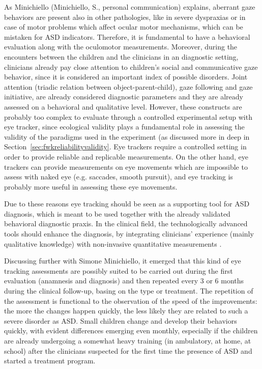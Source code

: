 As Minichiello (Minichiello, S., personal communication) explains, aberrant gaze behaviors are present also in other pathologies, like in severe dyspraxias or in case of motor problems which affect ocular motor mechanisms, which can be mistaken for ASD indicators. Therefore, it is fundamental to have a behavioral evaluation along with the oculomotor measurements.
Moreover, during the encounters between the children and the clinicians in an diagnostic setting, clinicians already pay close attention to children’s social and communicative gaze behavior, since it is considered an important index of possible disorders. Joint attention (triadic relation between object-parent-child), gaze following and gaze initiative, are already considered diagnostic parameters and they are already assessed on a behavioral and qualitative level. However, these constructs are probably too complex to evaluate through a controlled experimental setup with eye tracker, since ecological validity plays a fundamental role in assessing the validity of the paradigms used in the experiment (as discussed more in deep in Section~\ref{sec:fwkreliabilityvalidity}. Eye trackers require a controlled setting in order to provide reliable and replicable measurements. On the other hand, eye trackers can provide measurements on eye movements which are impossible to assess with naked eye (e.g. saccades, smooth pursuit), and eye tracking is probably more useful in assessing these eye movements.

Due to these reasons eye tracking should be seen as a supporting tool for ASD diagnosis, which is meant to be used together with the already validated behavioral diagnostic praxis. In the clinical field, the technologically advanced tools should enhance the diagnosis, by integrating clinicians’ experience (mainly qualitative knowledge) with non-invasive quantitative measurements \citep{orlandi2014advancedtools}.

Discussing further with Simone Minichiello, it emerged that this kind of eye tracking assessments are possibly suited to be carried out during the first evaluation (anamnesis and diagnosis) and then repeated every 3 or 6 months during the clinical follow-up, basing on the type or treatment. The repetition of the assessment is functional to the observation of the speed of the improvements: the more the changes happen quickly, the less likely they are related to such a severe disorder as ASD. Small children change and develop their behaviors quickly, with evident differences emerging even monthly, especially if the children are already undergoing a somewhat heavy training (in ambulatory, at home, at school) after the clinicians suspected for the first time the presence of ASD and started a treatment program.

